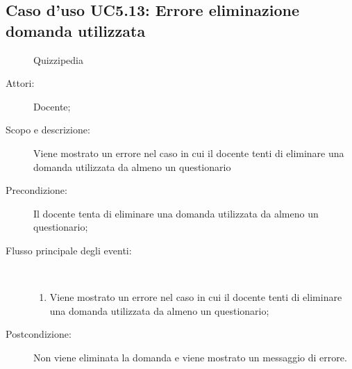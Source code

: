 \subsection{Caso d'uso UC5.13: Errore eliminazione domanda utilizzata}
	\begin{figure}[H]
		\centering
		\begin{resizedtikzpicture}{\textwidth}
		\begin{umlsystem}[x=0, fill=lightgray!20]{Quizzipedia}
		\end{umlsystem}
		\end{resizedtikzpicture}
		\caption{}
	\end{figure}
\begin{description}
\item[Attori:] Docente;
\item[Scopo e descrizione:] Viene mostrato un errore nel caso in cui il docente tenti di eliminare una domanda utilizzata da almeno un questionario
      \item[Precondizione:] Il docente tenta di eliminare una domanda utilizzata da almeno un questionario;

        \item[Flusso principale degli eventi:] \ 
 \begin{enumerate}
          \item Viene mostrato un errore nel caso in cui il docente tenti di eliminare una domanda utilizzata da almeno un questionario;

      \end{enumerate}
    \item[Postcondizione:] Non viene eliminata la domanda e viene mostrato un messaggio di errore.
  \end{description}
\hypertarget{UC6}{}
